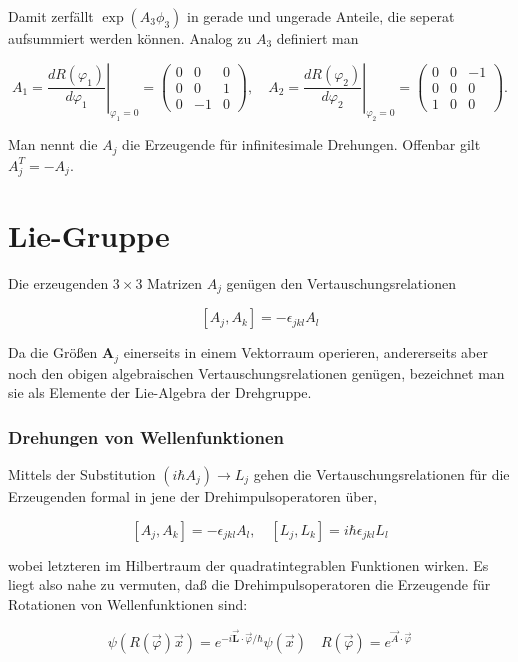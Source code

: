 \documentclass[10pt, letterpaper]{article}
\begin{document}
Damit zerfällt $\exp \left(A_{3} \phi_{3}\right)$ in gerade und ungerade Anteile, die seperat aufsummiert werden können. Analog zu $A_{3}$ definiert man

$$
A_{1}=\left.\frac{d R\left(\varphi_{1}\right)}{d \varphi_{1}}\right|_{\varphi_{1}=0}=\left(\begin{array}{ccc}
0 & 0 & 0 \\
0 & 0 & 1 \\
0 & -1 & 0
\end{array}\right), \quad A_{2}=\left.\frac{d R\left(\varphi_{2}\right)}{d \varphi_{2}}\right|_{\varphi_{2}=0}=\left(\begin{array}{ccc}
0 & 0 & -1 \\
0 & 0 & 0 \\
1 & 0 & 0
\end{array}\right) .
$$

Man nennt die $A_{j}$ die Erzeugende für infinitesimale Drehungen. Offenbar gilt $A_{j}^{T}=-A_{j}$.

\section*{Lie-Gruppe}
Die erzeugenden $3 \times 3$ Matrizen $A_{j}$ genügen den Vertauschungsrelationen

$$
\left[A_{j}, A_{k}\right]=-\epsilon_{j k l} A_{l}
$$

Da die Größen $\mathbf{A}_{j}$ einerseits in einem Vektorraum operieren, andererseits aber noch den obigen algebraischen Vertauschungsrelationen genügen, bezeichnet man sie als Elemente der Lie-Algebra der Drehgruppe.

\subsubsection*{Drehungen von Wellenfunktionen}
Mittels der Substitution $\left(i \hbar A_{j}\right) \rightarrow L_{j}$ gehen die Vertauschungsrelationen für die Erzeugenden formal in jene der Drehimpulsoperatoren über,

$$
\left[A_{j}, A_{k}\right]=-\epsilon_{j k l} A_{l}, \quad\left[L_{j}, L_{k}\right]=i \hbar \epsilon_{j k l} L_{l}
$$

wobei letzteren im Hilbertraum der quadratintegrablen Funktionen wirken. Es liegt also nahe zu vermuten, daß die Drehimpulsoperatoren die Erzeugende für Rotationen von Wellenfunktionen sind:

$$
\psi(R(\vec{\varphi}) \vec{x})=e^{-i \overrightarrow{\mathbf{L}} \cdot \vec{\varphi} / \hbar} \psi(\vec{x}) \quad R(\vec{\varphi})=e^{\vec{A} \cdot \vec{\varphi}}
$$
\end{document}
